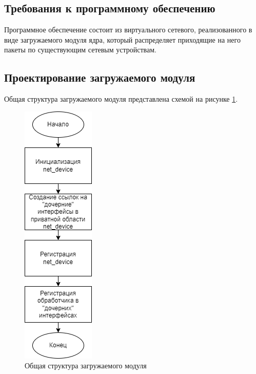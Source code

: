 \documentclass[14pt, a4paper]{extarticle}
\begin{document}
\subsection{Требования к программному обеспечению}
Программное обеспечение состоит из виртуального сетевого, реализованного в виде
загружаемого модуля ядра, который распределяет приходящие на него пакеты по существующим сетевым устройствам.

\subsection{Проектирование загружаемого модуля}
Общая структура загружаемого модуля представлена схемой на рисунке \ref{gen}.
\begin{figure}[H]
	\centering
	\includegraphics[scale=0.9]{gen.png}
	\caption{Общая структура загружаемого модуля}
	\label{gen}
\end{figure}
\end{document}
